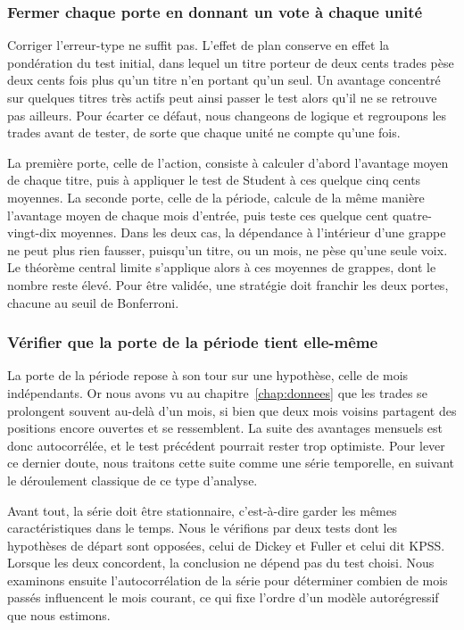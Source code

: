 \subsubsection*{Fermer chaque porte en donnant un vote à chaque unité}

Corriger l'erreur-type ne suffit pas. L'effet de plan conserve en effet
la pondération du test initial, dans lequel un titre porteur de deux
cents trades pèse deux cents fois plus qu'un titre n'en portant qu'un
seul. Un avantage concentré sur quelques titres très actifs peut ainsi
passer le test alors qu'il ne se retrouve pas ailleurs. Pour écarter ce
défaut, nous changeons de logique et regroupons les trades avant de
tester, de sorte que chaque unité ne compte qu'une fois.

La première porte, celle de l'action, consiste à calculer d'abord
l'avantage moyen de chaque titre, puis à appliquer le test de Student à
ces quelque cinq cents moyennes. La seconde porte, celle de la période,
calcule de la même manière l'avantage moyen de chaque mois d'entrée,
puis teste ces quelque cent quatre-vingt-dix moyennes. Dans les deux
cas, la dépendance à l'intérieur d'une grappe ne peut plus rien fausser,
puisqu'un titre, ou un mois, ne pèse qu'une seule voix. Le théorème
central limite s'applique alors à ces moyennes de grappes, dont le
nombre reste élevé. Pour être validée, une stratégie doit franchir les
deux portes, chacune au seuil de Bonferroni.

\subsubsection*{Vérifier que la porte de la période tient elle-même}

La porte de la période repose à son tour sur une hypothèse, celle de
mois indépendants. Or nous avons vu au chapitre~\ref{chap:donnees} que
les trades se prolongent souvent au-delà d'un mois, si bien que deux
mois voisins partagent des positions encore ouvertes et se ressemblent.
La suite des avantages mensuels est donc autocorrélée, et le test
précédent pourrait rester trop optimiste. Pour lever ce dernier doute,
nous traitons cette suite comme une série temporelle, en suivant le
déroulement classique de ce type d'analyse.

Avant tout, la série doit être stationnaire, c'est-à-dire garder les
mêmes caractéristiques dans le temps. Nous le vérifions par deux tests
dont les hypothèses de départ sont opposées, celui de Dickey et Fuller
et celui dit KPSS. Lorsque les deux concordent, la conclusion ne dépend
pas du test choisi. Nous examinons ensuite l'autocorrélation de la série
pour déterminer combien de mois passés influencent le mois courant, ce
qui fixe l'ordre d'un modèle autorégressif que nous estimons.

